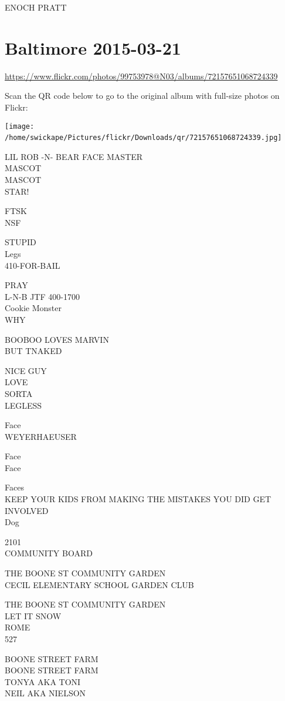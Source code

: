 \documentclass[10pt,letterpaper]{article}
\begin{document}
ENOCH PRATT
\

\section*{Baltimore 2015-03-21}

\url{https://www.flickr.com/photos/99753978@N03/albums/72157651068724339}

Scan the QR code below to go to the original album with full-size photos on Flickr:

\texttt{[image: /home/swickape/Pictures/flickr/Downloads/qr/72157651068724339.jpg]}
\

LIL ROB {-}N{-} BEAR FACE MASTER\\
MASCOT\\
MASCOT\\
STAR!

FTSK\\
NSF

STUPID\\
Legs\\
410{-}FOR{-}BAIL

PRAY\\
L{-}N{-}B JTF 400{-}1700\\
Cookie Monster\\
WHY

BOOBOO LOVES MARVIN\\
BUT TNAKED

NICE GUY\\
LOVE\\
SORTA\\
LEGLESS

Face\\
WEYERHAEUSER

Face\\
Face

Faces\\
KEEP YOUR KIDS FROM MAKING THE MISTAKES YOU DID GET INVOLVED\\
Dog

2101\\
COMMUNITY BOARD

THE BOONE ST COMMUNITY GARDEN\\
CECIL ELEMENTARY SCHOOL GARDEN CLUB

THE BOONE ST COMMUNITY GARDEN\\
LET IT SNOW\\
ROME\\
527

BOONE STREET FARM\\
BOONE STREET FARM\\
TONYA AKA TONI\\
NEIL AKA NIELSON
\end{document}
